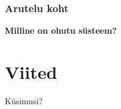 \begin{frame}[fragile]
  \frametitle{Arutelu koht}
		\begin{center}
			\textbf{Milline on ohutu süsteem?}
		\end{center}
\end{frame}


\section{Viited}

\begin{frame}[t,allowframebreaks,]
  	
	 

\end{frame}

\begin{frame}[plain]
	\begin{center}Küsimusi?\end{center}
\end{frame}


